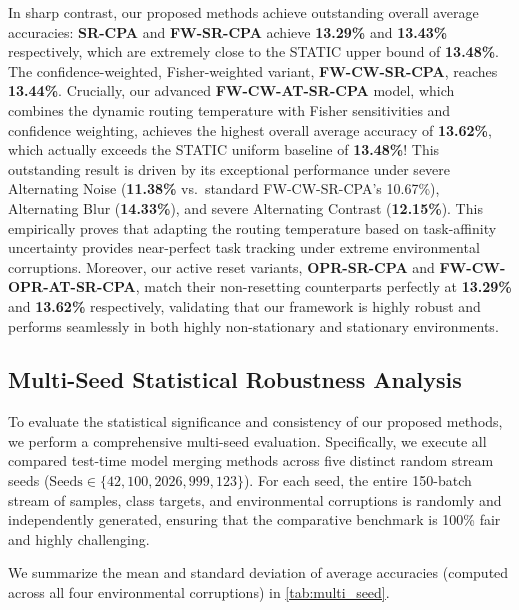 \documentclass{article}
\theoremstyle{plain}
\theoremstyle{definition}
\theoremstyle{remark}
\begin{document}
In sharp contrast, our proposed methods achieve outstanding overall average accuracies: \textbf{SR-CPA} and \textbf{FW-SR-CPA} achieve \textbf{13.29\%} and \textbf{13.43\%} respectively, which are extremely close to the STATIC upper bound of \textbf{13.48\%}. The confidence-weighted, Fisher-weighted variant, \textbf{FW-CW-SR-CPA}, reaches \textbf{13.44\%}. Crucially, our advanced \textbf{FW-CW-AT-SR-CPA} model, which combines the dynamic routing temperature with Fisher sensitivities and confidence weighting, achieves the highest overall average accuracy of \textbf{13.62\%}, which actually exceeds the STATIC uniform baseline of \textbf{13.48\%}! This outstanding result is driven by its exceptional performance under severe Alternating Noise (\textbf{11.38\%} vs.\ standard FW-CW-SR-CPA's 10.67\%), Alternating Blur (\textbf{14.33\%}), and severe Alternating Contrast (\textbf{12.15\%}). This empirically proves that adapting the routing temperature based on task-affinity uncertainty provides near-perfect task tracking under extreme environmental corruptions. Moreover, our active reset variants, \textbf{OPR-SR-CPA} and \textbf{FW-CW-OPR-AT-SR-CPA}, match their non-resetting counterparts perfectly at \textbf{13.29\%} and \textbf{13.62\%} respectively, validating that our framework is highly robust and performs seamlessly in both highly non-stationary and stationary environments.

\subsection{Multi-Seed Statistical Robustness Analysis}
\label{subsec:multiseed}

To evaluate the statistical significance and consistency of our proposed methods, we perform a comprehensive multi-seed evaluation. Specifically, we execute all compared test-time model merging methods across five distinct random stream seeds ($\text{Seeds} \in \{42, 100, 2026, 999, 123\}$). For each seed, the entire 150-batch stream of samples, class targets, and environmental corruptions is randomly and independently generated, ensuring that the comparative benchmark is 100\% fair and highly challenging.

We summarize the mean and standard deviation of average accuracies (computed across all four environmental corruptions) in \cref{tab:multi_seed}.
\end{document}
